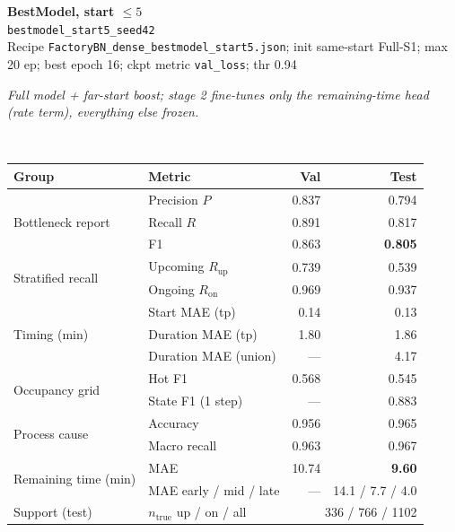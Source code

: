 \documentclass[9pt,a4paper,twocolumn]{extarticle}
\begin{document}
\noindent\begin{minipage}{\columnwidth}
\begin{center}
{\small\bfseries BestModel, start $\le 5$}\\
{\scriptsize\texttt{bestmodel\_start5\_seed42}}\\
{\scriptsize Recipe \texttt{FactoryBN\_dense\_bestmodel\_start5.json}; init same-start Full-S1; max 20 ep; best epoch 16; ckpt metric \texttt{val\_loss}; thr 0.94}\\[1pt]
\parbox{0.96\columnwidth}{\scriptsize\itshape Full model + far-start boost; stage 2 fine-tunes only the remaining-time head (rate term), everything else frozen.}\\[2pt]
\scriptsize\setlength{\tabcolsep}{3pt}
\begin{tabular}{llrr}
\toprule
Group & Metric & Val & Test \\
\midrule
\multirow{3}{*}{Bottleneck report}
  & Precision $P$ & 0.837 & 0.794 \\
  & Recall $R$ & 0.891 & 0.817 \\
  & F1 & 0.863 & \textbf{0.805} \\
\midrule
\multirow{2}{*}{Stratified recall}
  & Upcoming $R_{\mathrm{up}}$ & 0.739 & 0.539 \\
  & Ongoing $R_{\mathrm{on}}$ & 0.969 & 0.937 \\
\midrule
\multirow{3}{*}{Timing (min)}
  & Start MAE (tp) & 0.14 & 0.13 \\
  & Duration MAE (tp) & 1.80 & 1.86 \\
  & Duration MAE (union) & --- & 4.17 \\
\midrule
\multirow{2}{*}{Occupancy grid}
  & Hot F1 & 0.568 & 0.545 \\
  & State F1 (1 step) & --- & 0.883 \\
\midrule
\multirow{2}{*}{Process cause}
  & Accuracy & 0.956 & 0.965 \\
  & Macro recall & 0.963 & 0.967 \\
\midrule
\multirow{2}{*}{Remaining time (min)}
  & MAE & 10.74 & \textbf{9.60} \\
  & MAE early / mid / late & --- & 14.1 / 7.7 / 4.0 \\
\midrule
Support (test)
  & $n_{\mathrm{true}}$ up / on / all & \multicolumn{2}{r}{336 / 766 / 1102} \\
\bottomrule
\end{tabular}
\end{center}
\end{minipage}\par\vspace{6pt}
\end{document}
